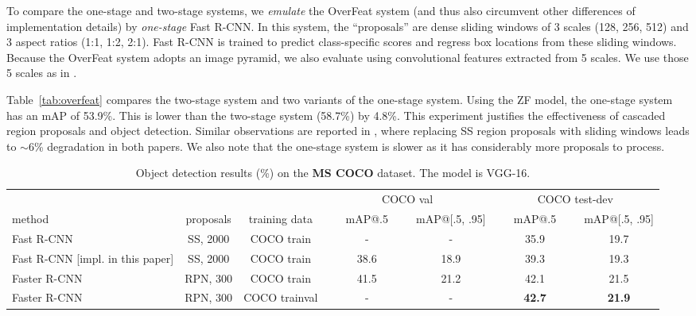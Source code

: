 \documentclass[10pt,journal,cspaper,compsoc]{IEEEtran}
\begin{document}
To compare the one-stage and two-stage systems, we \emph{emulate} the OverFeat system (and thus also circumvent other differences of implementation details) by \emph{one-stage} Fast R-CNN. In this system, the ``proposals'' are dense sliding windows of 3 scales (128, 256, 512) and 3 aspect ratios (1:1, 1:2, 2:1).
Fast R-CNN is trained to predict class-specific scores and regress box locations from these sliding windows. Because the OverFeat system adopts an image pyramid, we also evaluate using convolutional features extracted from 5 scales. We use those 5 scales as in \cite{He2014,Girshick2015a}.

Table~\ref{tab:overfeat} compares the two-stage system and two variants of the one-stage system. Using the ZF model, the one-stage system has an mAP of 53.9\%. This is lower than the two-stage system (58.7\%) by 4.8\%. This experiment justifies the effectiveness of cascaded region proposals and object detection. Similar observations are reported in \cite{Girshick2015a,Lenc2015}, where replacing SS region proposals with sliding windows leads to $\sim$6\% degradation in both papers.
We also note that the one-stage system is slower as it has considerably more proposals to process.

\setlength{\tabcolsep}{2pt}
\renewcommand{\arraystretch}{1.1}
\begin{table}[t]
\begin{center}
\caption{Object detection results (\%) on the \textbf{MS COCO} dataset. The model is VGG-16.}
\vspace{-1em}
\small
\begin{tabular}{l|c|c|c|c|c|c}
       &           &               & \multicolumn{2}{c|}{COCO val} & \multicolumn{2}{c}{COCO test-dev}\\\cline{4-7}
method & proposals & training data & ~~~mAP@.5~~~ & mAP@[.5, .95]  & ~~~mAP@.5~~~ & mAP@[.5, .95] \\
\hline\hline
Fast R-CNN \cite{Girshick2015a} & SS, 2000 & COCO train & - & - & 35.9 & 19.7 \\
Fast R-CNN \footnotesize [impl. in this paper] & SS, 2000 & COCO train & 38.6 & 18.9 & 39.3 & 19.3\\
\hline
Faster R-CNN & RPN, 300 & COCO train & 41.5 & 21.2 & 42.1 & 21.5 \\
Faster R-CNN & RPN, 300 & COCO trainval & - & - & \textbf{42.7} & \textbf{21.9} \\
\end{tabular}
\label{tab:coco}
\end{center}
\end{table}
\end{document}
